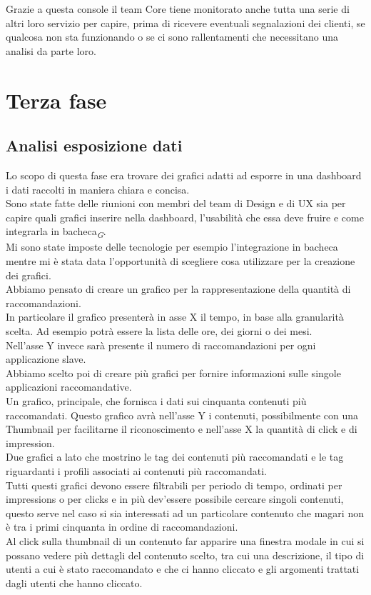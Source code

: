 \documentclass[a4paper, 12pt, twoside, openright]{book}
\newcommand{\gloss}[1]{#1\textsubscript{\textit{\tiny{G}}}}
\begin{document}
Grazie a questa console il team Core tiene monitorato anche tutta una serie di altri loro servizio per capire, prima di ricevere eventuali segnalazioni dei clienti, se qualcosa non sta funzionando o se ci sono rallentamenti che necessitano una analisi da parte loro.\\

\section{Terza fase}

\subsection{Analisi esposizione dati}
Lo scopo di questa fase era trovare dei grafici adatti ad esporre in una dashboard i dati raccolti in maniera chiara e concisa.\\
Sono state fatte delle riunioni con membri del team di Design e di UX sia per capire quali grafici inserire nella dashboard, l'usabilità che essa deve fruire e come integrarla in \gloss{bacheca}.\\
Mi sono state imposte delle tecnologie per esempio l'integrazione in bacheca mentre mi è stata data l'opportunità di scegliere cosa utilizzare per la creazione dei grafici.\\
Abbiamo pensato di creare un grafico per la rappresentazione della quantità di raccomandazioni.\\
In particolare il grafico presenterà in asse X il tempo, in base alla granularità scelta. Ad esempio potrà essere la lista delle ore, dei giorni o dei mesi.\\
Nell'asse Y invece sarà presente il numero di raccomandazioni per ogni applicazione slave.\\
Abbiamo scelto poi di creare più grafici per fornire informazioni sulle singole applicazioni raccomandative.\\
Un grafico, principale, che fornisca i dati sui cinquanta contenuti più raccomandati. Questo grafico avrà nell'asse Y i contenuti, possibilmente con una Thumbnail per facilitarne il riconoscimento e nell'asse X la quantità di click e di impression.\\
Due grafici a lato che mostrino le tag dei contenuti più raccomandati e le tag riguardanti i profili associati ai contenuti più raccomandati.\\
Tutti questi grafici devono essere filtrabili per periodo di tempo, ordinati per impressions o per clicks e in più dev'essere possibile cercare singoli contenuti, questo serve nel caso si sia interessati ad un particolare contenuto che magari non è tra i primi cinquanta in ordine di raccomandazioni.\\
Al click sulla thumbnail di un contenuto far apparire una finestra modale in cui si possano vedere più dettagli del contenuto scelto, tra cui una descrizione, il tipo di utenti a cui è stato raccomandato e che ci hanno cliccato e gli argomenti trattati dagli utenti che hanno cliccato.
\end{document}
